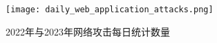 
\begin{figure}[htbp]
  \centering
  \texttt{[image: daily\_web\_application\_attacks.png]}
  \caption{2022年与2023年网络攻击每日统计数量\cite{akamai}}
  \label{fig:daily_web_application_attacks}
\end{figure}





